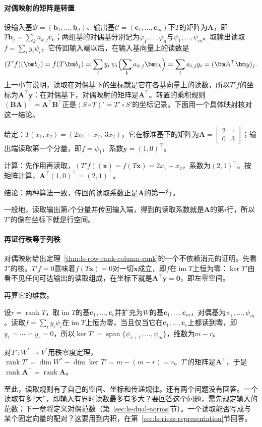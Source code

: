 \paragraph{对偶映射的矩阵是转置}
设输入基$\mathcal B=(\bm b_1,\ldots,\bm b_d)$、输出基$\mathcal C=(\bm c_1,\ldots,\bm c_m)$下$T$的矩阵为$\bm A$，即$T\bm b_j=\sum_ka_{k,j}\bm c_k$；两组基的对偶基分别记为$\varphi_1,\ldots,\varphi_d$与$\psi_1,\ldots,\psi_m$。取输出读取$f=\sum_iy_i\psi_i$，它传回输入端以后，在输入基向量上的读数是
\[
 (T'f)(\bm b_j)=f(T\bm b_j)
 =\sum_iy_i\,\psi_i\Bigl(\sum_ka_{k,j}\bm c_k\Bigr)
 =\sum_ia_{i,j}y_i=(\bm A^\top\bm y)_j .
\]
上一小节说明，读取在对偶基下的坐标就是它在各基向量上的读数，所以$T'f$的坐标为$\bm A^\top\bm y$：在对偶基下，对偶映射的矩阵是$\bm A^\top$。转置的乘积规则$(\bm B\bm A)^\top=\bm A^\top\bm B^\top$正是$(S\circ T)'=T'\circ S'$的坐标记录。下面用一个具体映射核对这一结论。
\begin{example}[把输出的第一个分量读取传回输入端]
\label{ex:ls-dual-map-first-component}
给定：$T(x_1,x_2)=(2x_1+x_2,\ 3x_2)$，它在标准基下的矩阵为$\bm A=\left[\begin{smallmatrix}2&1\\0&3\end{smallmatrix}\right]$；输出端读取第一个分量，即$f=\psi_1$，系数$\bm y=(1,0)^\top$。

计算：先作用再读取，$(T'f)(\bm x)=f(T\bm x)=2x_1+x_2$，系数为$(2,1)^\top$。按矩阵计算，$\bm A^\top(1,0)^\top=(2,1)^\top$。

结论：两种算法一致，传回的读取系数正是$\bm A$的第一行。
\end{example}
一般地，读取输出第$i$个分量并传回输入端，得到的读取系数就是$\bm A$的第$i$行，所以$T'$的像在坐标下就是行空间。

\paragraph{再证行秩等于列秩}
对偶映射给出定理~\ref{thm:ls-row-rank-column-rank}的一个不依赖消元的证明。先看$T'$的核。$T'f=0$意味着$f(T\bm x)=0$对一切$\bm x$成立，即$f$在$\operatorname{im}T$上恒为零：$\ker T'$由看不见任何可达输出的读取组成，在坐标下就是$\bm A^\top\bm y=\bm0$，即左零空间。

再算它的维数。

设$r=\operatorname{rank}T$，取$\operatorname{im}T$的基$\bm c_1,\ldots,\bm c_r$并扩充为$W$的基$\bm c_1,\ldots,\bm c_m$，对偶基为$\psi_1,\ldots,\psi_m$。读取$f=\sum_iy_i\psi_i$在$\operatorname{im}T$上恒为零，当且仅当它在$\bm c_1,\ldots,\bm c_r$上都读到零，即$y_1=\cdots=y_r=0$，所以$\ker T'=\operatorname{span}\{\psi_{r+1},\ldots,\psi_m\}$，维数为$m-r$。

对$T':W^*\to V^*$用秩零度定理，$\operatorname{rank}T'=\dim W^*-\dim\ker T'=m-(m-r)=r$。$T'$的矩阵是$\bm A^\top$，于是$\operatorname{rank}\bm A^\top=\operatorname{rank}\bm A$。

至此，读取规则有了自己的空间、坐标和传递规律。还有两个问题没有回答。一个读取有多“大”，即输入有界时读数最多有多大？要回答这个问题，需先规定输入的范数；下一章将定义对偶范数（第~\ref{sec:ls-dual-norms}节）。一个读取能否写成与某个固定向量的配对？这要用到内积，在第~\ref{sec:ls-riesz-representation}节回答。
